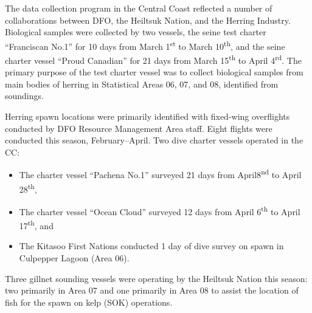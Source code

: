 The data collection program in the Central Coast reflected a number of collaborations between DFO, the Heiltsuk Nation, and the Herring Industry.
Biological samples were collected by two vessels, the seine test charter ``Franciscan No.1'' for 10 days from March 1\textsuperscript{st} to March 10\textsuperscript{th}, and the seine charter vessel ``Proud Canadian'' for 21 days from March 15\textsuperscript{th} to April 4\textsuperscript{rd}.
The primary purpose of the test charter vessel was to collect biological samples from main bodies of herring in Statistical Areas 06, 07, and 08, identified from soundings.
 
Herring spawn locations were primarily identified with fixed-wing overflights conducted by DFO Resource Management Area staff.
Eight flights were conducted this season, February--April.
Two dive charter vessels operated in the CC:
\begin{itemize}
\item The charter vessel ``Pachena No.1'' surveyed 21 days from April8\textsuperscript{nd} to April 28\textsuperscript{th}, 
\item The charter vessel ``Ocean Cloud'' surveyed 12 days from April 6\textsuperscript{th} to April 17\textsuperscript{th}, and 
\item The Kitasoo First Nations conducted 1 day of dive survey on spawn in Culpepper Lagoon (Area 06).
\end{itemize}
Three gillnet sounding vessels were operating by the Heiltsuk Nation this season: two primarily in Area 07 and one primarily in Area 08 to assist the location of fish for the spawn on kelp (SOK) operations.